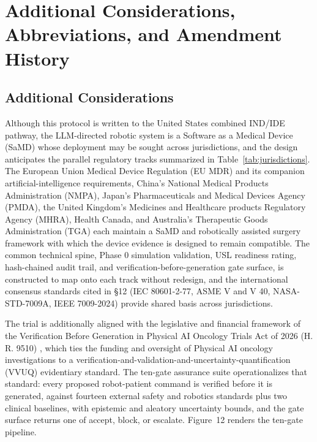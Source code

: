 \section{Additional Considerations, Abbreviations, and Amendment History}

\subsection{Additional Considerations}

Although this protocol is written to the United States combined IND/IDE pathway,
the LLM-directed robotic system is a Software as a Medical Device (SaMD) whose
deployment may be sought across jurisdictions, and the design anticipates the
parallel regulatory tracks summarized in Table~\ref{tab:jurisdictions}. The
European Union Medical Device Regulation (EU MDR) and its companion artificial-intelligence
requirements, China's National Medical Products Administration (NMPA), Japan's
Pharmaceuticals and Medical Devices Agency (PMDA), the United Kingdom's Medicines
and Healthcare products Regulatory Agency (MHRA), Health Canada, and Australia's
Therapeutic Goods Administration (TGA) each maintain a SaMD and robotically
assisted surgery framework with which the device evidence is designed to remain
compatible. The common technical spine, Phase 0 simulation validation, USL
readiness rating, hash-chained audit trail, and verification-before-generation
gate surface, is constructed to map onto each track without redesign, and the
international consensus standards cited in \S12 (IEC 80601-2-77, ASME V and V 40,
NASA-STD-7009A, IEEE 7009-2024) provide shared basis across jurisdictions.

The trial is additionally aligned with the legislative and financial framework of
the Verification Before Generation in Physical AI Oncology Trials Act of 2026 (H.
R. 9510) \cite{kawchak2026hr9510}, which ties the funding and oversight of Physical
AI oncology investigations to a verification-and-validation-and-uncertainty-quantification
(VVUQ) evidentiary standard. The ten-gate assurance suite operationalizes that
standard: every proposed robot-patient command is verified before it is generated,
against fourteen external safety and robotics standards plus two clinical
baselines, with epistemic and aleatory uncertainty bounds, and the gate surface
returns one of accept, block, or escalate. Figure~12 renders the ten-gate
pipeline.

